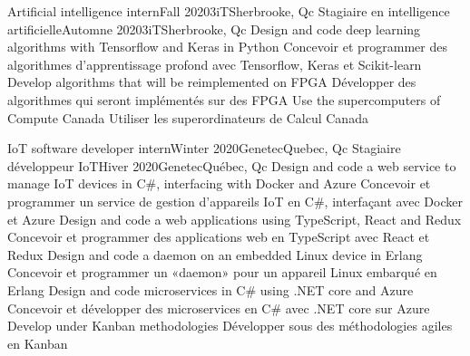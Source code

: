         \resumeSubheadingEnFr
            {Artificial intelligence intern}{Fall 2020}{3iT}{Sherbrooke, Qc}
            {Stagiaire en intelligence artificielle}{Automne 2020}{3iT}{Sherbrooke, Qc}
                \resumeItemListStart
                    \resumeItemEnFr
                        {Design and code deep learning algorithms with Tensorflow and Keras in Python}
                        {Concevoir et programmer des algorithmes d’apprentissage profond avec Tensorflow, Keras et Scikit-learn}
                    \resumeItemEnFr
                        {Develop algorithms that will be reimplemented on FPGA}
                        {Développer des algorithmes qui seront implémentés sur des FPGA}
                    \resumeItemEnFr
                        {Use the supercomputers of Compute Canada}
                        {Utiliser les superordinateurs de Calcul Canada}
                \resumeItemListEnd
            
        \resumeSubheadingEnFr
            {IoT software developer intern}{Winter 2020}{Genetec}{Quebec, Qc}
            {Stagiaire développeur IoT}{Hiver 2020}{Genetec}{Québec, Qc}
                \resumeItemListStart
                    \resumeItemEnFr
                        {Design and code a web service to manage IoT devices in C\#, interfacing with Docker and Azure}
                        {Concevoir et programmer un service de gestion d’appareils IoT en C\#, interfaçant avec Docker et Azure}
                    \resumeItemEnFr
                        {Design and code a web applications using TypeScript, React and Redux}
                        {Concevoir et programmer des applications web en TypeScript avec React et Redux}
                    \resumeItemEnFr
                        {Design and code a daemon on an embedded Linux device in Erlang}
                        {Concevoir et programmer un «daemon» pour un appareil Linux embarqué en Erlang}
                    \resumeItemEnFr
                        {Design and code microservices in C\# using .NET core and Azure}
                        {Concevoir et développer des microservices en C\# avec .NET core sur Azure}
                    \resumeItemEnFr
                        {Develop under Kanban methodologies}
                        {Développer sous des méthodologies agiles en Kanban}
                \resumeItemListEnd
    
